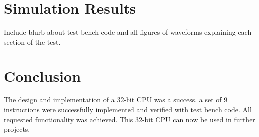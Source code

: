 \documentclass[12pt]{article}
\begin{document}
\section{Simulation Results}
Include blurb about test bench code and all figures of waveforms explaining each section of the test.

\section{Conclusion}
The design and implementation of a 32-bit CPU was a success. a set of 9 instructions were successfully implemented and verified with test bench code. All requested functionality was achieved. This 32-bit CPU can now be used in further projects.
\end{document}
